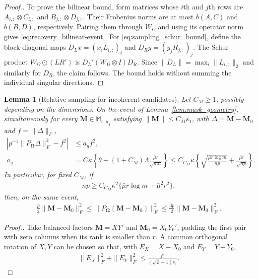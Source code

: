 \documentclass[numsec,webpdf,modern,large,namedate]{oup-authoring-template}
\theoremstyle{plain}
\newtheorem{slemma}{Lemma}%
\theoremstyle{remark}
\newcommand{\M}{\bm{M}}
\newcommand{\bOmega}{\bm{\Omega}}
\newif\ifmarkchanges
\newenvironment{revision}{\begingroup\ifmarkchanges\color{red}\fi}{\endgroup}
\begin{document}
\begin{revision}
\begin{proof}[Proof.]
To prove the bilinear bound, form matrices whose $i$th and $j$th rows are
$A_{i,:}\otimes C_{i,:}$ and $B_{j,:}\otimes D_{j,:}$.
Their Frobenius norms are at most $b(A,C)$ and
$b(B,D)$, respectively.  Pairing them through $W_\Omega$
and using its operator norm gives \eqref{eq:recovery_bilinear-event}.
For \eqref{eq:sampling_schur_bound}, define the block-diagonal maps
$D_Lx=(x_iL_{i,:})_i$ and $D_Ry=(y_jR_{j,:})_j$.
The Schur product $W_\Omega\odot(LR')$ is
$D_L'(W_\Omega\otimes I)D_R$.
Since $\|D_L\|=\max_i\|L_{i,:}\|_2$ and similarly for $D_R$, the claim
follows.  The bound holds without summing the individual singular directions.
\end{proof}

\begin{slemma}[Relative sampling for incoherent candidates]
\label{lem:global_relative_sampling}
Let $C_M\ge1$, possibly depending on the dimensions.  On the event of
Lemma~\ref{lem:mask_geometry}, simultaneously for every
$\M\in\mathbb M_{r,\mu_1}$ satisfying $\|\M\|\le C_Ms_1$, with
$\Delta=\M-\M_0$ and $f=\|\Delta\|_F$,
\begin{align}
 \left|p^{-1}\|P_{\bOmega}\Delta\|_F^2-f^2\right|
 &\le a_g f^2,\label{eq:sampling_global_relative_sampling}\\
 a_g&=C\kappa\left\{\theta+(1+C_M)
                   \Lambda\frac{\bar\mu r}{\sqrt{mn}}\right\}
 \le C_{C_M}\kappa\left\{
      \sqrt{\frac{\bar\mu r\log m}{np}}+
      \frac{\bar\mu r}{\sqrt{np}}\right\}.
 \label{eq:sampling_global_sampling_constant}
\end{align}
In particular, for fixed $C_M$, if
\begin{align}
 np\ge C_{C_M}\kappa^2\{\bar\mu r\log m+\bar\mu^2r^2\},
 \label{eq:relative_sampling_condition}
\end{align}
then, on the same event,
\begin{align}
 \frac p2\|\M-\M_0\|_F^2
 \le\|P_{\bOmega}(\M-\M_0)\|_F^2
 \le\frac{3p}2\|\M-\M_0\|_F^2.
 \label{eq:factor_local_rsc}
\end{align}
\end{slemma}
\begin{proof}[Proof.]
Take balanced factors $\M=XY'$ and $\M_0=X_0Y_0'$, padding the first
pair with zero columns when its rank is smaller than $r$.  A common
orthogonal rotation of $X,Y$ can be chosen so that, with
$E_X=X-X_0$ and $E_Y=Y-Y_0$,
\begin{align}
 \|E_X\|_F^2+\|E_Y\|_F^2
 \le\frac{f^2}{(\sqrt2-1)s_\star}.
 \label{eq:sampling_global_factor_distance}
\end{align}

\end{proof}
\end{revision}
\end{document}
